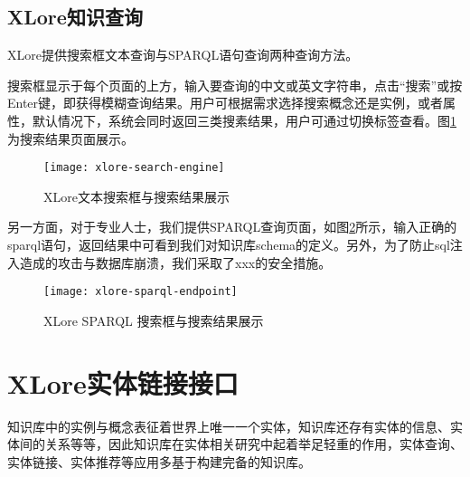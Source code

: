 
\subsection{XLore知识查询}
XLore提供搜索框文本查询与SPARQL语句查询两种查询方法。

搜索框显示于每个页面的上方，输入要查询的中文或英文字符串，点击“搜索”或按Enter键，即获得模糊查询结果。用户可根据需求选择搜索概念还是实例，或者属性，默认情况下，系统会同时返回三类搜素结果，用户可通过切换标签查看。图\ref{fig:xlore-search-engine}为搜索结果页面展示。

\begin{figure}[H]
  \centering
  \texttt{[image: xlore-search-engine]}
  \caption{XLore文本搜索框与搜索结果展示}
  \label{fig:xlore-search-engine}
\end{figure}

另一方面，对于专业人士，我们提供SPARQL查询页面，如图\ref{fig:xlore-sparql-endpoint}所示，输入正确的sparql语句，返回结果中可看到我们对知识库schema的定义。另外，为了防止sql注入造成的攻击与数据库崩溃，我们采取了xxx的安全措施。

\begin{figure}[H]
  \centering
  \texttt{[image: xlore-sparql-endpoint]}
  \caption{XLore SPARQL 搜索框与搜索结果展示}
  \label{fig:xlore-sparql-endpoint}
\end{figure}

\section{XLore实体链接接口}
\label{sec5:entity-linking-api}

知识库中的实例与概念表征着世界上唯一一个实体，知识库还存有实体的信息、实体间的关系等等，因此知识库在实体相关研究中起着举足轻重的作用，实体查询、实体链接、实体推荐等应用多基于构建完备的知识库。

